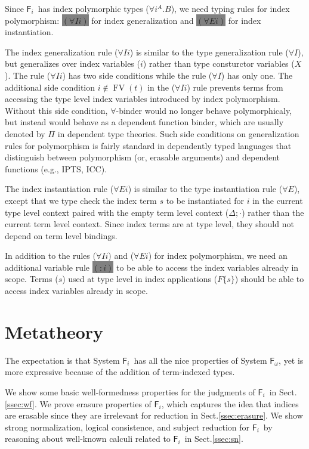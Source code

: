 \documentclass{llncs}
\newcommand{\newFi}[1]{\colorbox{grey}{\ensuremath{#1}}}
\newcommand{\eg}{{e.g.}}
\newcommand{\Fi}{\ensuremath{\mathsf{F}_i}}
\newcommand{\Fw}{\ensuremath{\mathsf{F}_\omega}}
\newcommand{\FV}{\mathop{\mathrm{FV}}}
\renewcommand{\S}[0]{Sect.\;}
\begin{document}
Since \Fi\ has index polymorphic types ($\forall i^A . B$),
we need typing rules for index polymorphism:
\newFi{(\forall I i)} for index generalization
and \newFi{(\forall E i)} for index instantiation.

The index generalization rule ($\forall I i$) is similar to
the type generalization rule ($\forall I$), but generalizes over
index variables ($i$) rather than type consturctor variables ($X$).
The rule ($\forall I i$) has two side conditions
while the rule ($\forall I$) has only one.
The additional side condition $i\notin\FV(t)$ in the ($\forall I i$) rule
prevents terms from accessing the type level index variables introduced by
index polymorphism. Without this side condition, $\forall$-binder
would no longer behave polymorphicaly, but instead would behave as
a dependent function binder, which are usually denoted by $\Pi$ in
dependent type theories.
Such side conditions on generalization rules for polymorphism is fairly standard
in dependently typed languages that distinguish between polymorphism
(or, erasable arguments) and dependent functions (\eg, IPTS\cite{LingerS08},
ICC\cite{Miquel01}).

The index instantiation rule ($\forall E i$) is similar to
the type instantiation rule ($\forall E$), except that
we type check the index term $s$ to be instantiated for $i$
in the current type level context paired with the empty term level context
($\Delta;\cdot$) rather than the current term level context.
Since index terms are at type level, they should not depend on
term level bindings.

In addition to the rules ($\forall I i$) and ($\forall E i$) for
index polymorphism, we need an additional variable rule \newFi{(:i)}
to be able to access the index variables already in scope. Terms ($s$) used
at type level in index applications ($F\{s\}$) should be able to access
index variables already in scope. 

\section{Metatheory} \label{sec:theory}

The expectation is that System \Fi\ has all the nice properties of System \Fw,
yet is more expressive because of the addition of term-indexed types.

We show some basic well-formedness properties for
the judgments of \Fi\ in \S\ref{ssec:wf}.
We prove erasure properties of \Fi, which captures the idea that indices are
erasable since they are irrelevant for reduction in \S\ref{ssec:erasure}.
We show strong normalization, logical consistence, and subject reduction for
\Fi\ by reasoning about well-known calculi related to \Fi\ in \S\ref{ssec:sn}.
\end{document}
